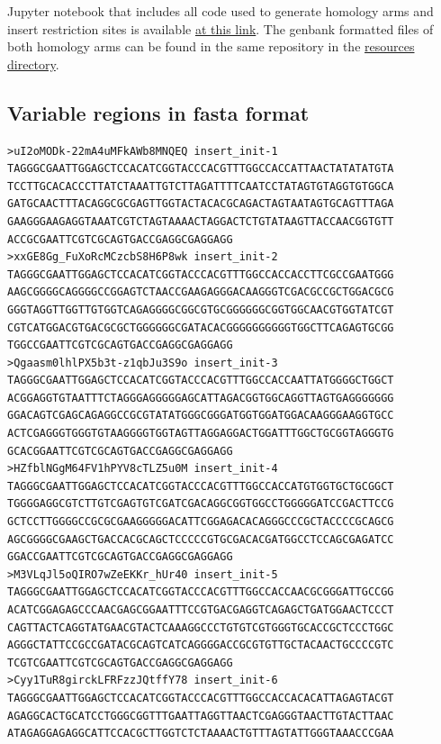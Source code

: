 \documentclass[11pt]{article}
\begin{document}
Jupyter notebook that includes all code used to generate homology arms and insert
restriction sites is available  \href{https://github.com/EthanHolleman/plasmid-VR-design/blob/main/notes/homology_arms.ipynb}{at this link}. The genbank formatted files of both homology arms can be found in the same repository in the \href{https://github.com/EthanHolleman/plasmid-VR-design/tree/main/resources/files/genbank}{resources directory}.

\subsection{Variable regions in fasta format}
\label{sec:fasta-inserts}

\begin{verbatim}
>uI2oMODk-22mA4uMFkAWb8MNQEQ insert_init-1
TAGGGCGAATTGGAGCTCCACATCGGTACCCACGTTTGGCCACCATTAACTATATATGTA
TCCTTGCACACCCTTATCTAAATTGTCTTAGATTTTCAATCCTATAGTGTAGGTGTGGCA
GATGCAACTTTACAGGCGCGAGTTGGTACTACACGCAGACTAGTAATAGTGCAGTTTAGA
GAAGGGAAGAGGTAAATCGTCTAGTAAAACTAGGACTCTGTATAAGTTACCAACGGTGTT
ACCGCGAATTCGTCGCAGTGACCGAGGCGAGGAGG
>xxGE8Gg_FuXoRcMCzcbS8H6P8wk insert_init-2
TAGGGCGAATTGGAGCTCCACATCGGTACCCACGTTTGGCCACCACCTTCGCCGAATGGG
AAGCGGGGCAGGGGCCGGAGTCTAACCGAAGAGGGACAAGGGTCGACGCCGCTGGACGCG
GGGTAGGTTGGTTGTGGTCAGAGGGGCGGCGTGCGGGGGGCGGTGGCAACGTGGTATCGT
CGTCATGGACGTGACGCGCTGGGGGGCGATACACGGGGGGGGGGTGGCTTCAGAGTGCGG
TGGCCGAATTCGTCGCAGTGACCGAGGCGAGGAGG
>Qgaasm0lhlPX5b3t-z1qbJu3S9o insert_init-3
TAGGGCGAATTGGAGCTCCACATCGGTACCCACGTTTGGCCACCAATTATGGGGCTGGCT
ACGGAGGTGTAATTTCTAGGGAGGGGGAGCATTAGACGGTGGCAGGTTAGTGAGGGGGGG
GGACAGTCGAGCAGAGGCCGCGTATATGGGCGGGATGGTGGATGGACAAGGGAAGGTGCC
ACTCGAGGGTGGGTGTAAGGGGTGGTAGTTAGGAGGACTGGATTTGGCTGCGGTAGGGTG
GCACGGAATTCGTCGCAGTGACCGAGGCGAGGAGG
>HZfblNGgM64FV1hPYV8cTLZ5u0M insert_init-4
TAGGGCGAATTGGAGCTCCACATCGGTACCCACGTTTGGCCACCATGTGGTGCTGCGGCT
TGGGGAGGCGTCTTGTCGAGTGTCGATCGACAGGCGGTGGCCTGGGGGATCCGACTTCCG
GCTCCTTGGGGCCGCGCGAAGGGGGACATTCGGAGACACAGGGCCCGCTACCCCGCAGCG
AGCGGGGCGAAGCTGACCACGCAGCTCCCCCGTGCGACACGATGGCCTCCAGCGAGATCC
GGACCGAATTCGTCGCAGTGACCGAGGCGAGGAGG
>M3VLqJl5oQIRO7wZeEKKr_hUr40 insert_init-5
TAGGGCGAATTGGAGCTCCACATCGGTACCCACGTTTGGCCACCAACGCGGGATTGCCGG
ACATCGGAGAGCCCAACGAGCGGAATTTCCGTGACGAGGTCAGAGCTGATGGAACTCCCT
CAGTTACTCAGGTATGAACGTACTCAAAGGCCCTGTGTCGTGGGTGCACCGCTCCCTGGC
AGGGCTATTCCGCCGATACGCAGTCATCAGGGGACCGCGTGTTGCTACAACTGCCCCGTC
TCGTCGAATTCGTCGCAGTGACCGAGGCGAGGAGG
>Cyy1TuR8girckLFRFzzJQtffY78 insert_init-6
TAGGGCGAATTGGAGCTCCACATCGGTACCCACGTTTGGCCACCACACATTAGAGTACGT
AGAGGCACTGCATCCTGGGCGGTTTGAATTAGGTTAACTCGAGGGTAACTTGTACTTAAC
ATAGAGGAGAGGCATTCCACGCTTGGTCTCTAAAACTGTTTAGTATTGGGTAAACCCGAA

\end{verbatim}
\end{document}
